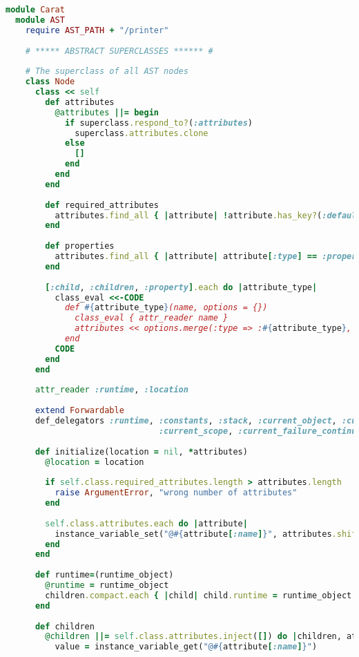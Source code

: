 \begin{lstlisting}[title={\small\ttfamily\bfseries ast/ast.rb},language=Ruby]
module Carat
  module AST
    require AST_PATH + "/printer"
    
    # ***** ABSTRACT SUPERCLASSES ****** #
    
    # The superclass of all AST nodes
    class Node
      class << self
        def attributes
          @attributes ||= begin
            if superclass.respond_to?(:attributes)
              superclass.attributes.clone
            else
              []
            end
          end
        end
        
        def required_attributes
          attributes.find_all { |attribute| !attribute.has_key?(:default) }
        end
        
        def properties
          attributes.find_all { |attribute| attribute[:type] == :property }
        end
        
        [:child, :children, :property].each do |attribute_type|
          class_eval <<-CODE
            def #{attribute_type}(name, options = {})
              class_eval { attr_reader name }
              attributes << options.merge(:type => :#{attribute_type}, :name => name)
            end
          CODE
        end
      end
      
      attr_reader :runtime, :location
      
      extend Forwardable
      def_delegators :runtime, :constants, :stack, :current_object, :current_location,
                               :current_scope, :current_failure_continuation
      
      def initialize(location = nil, *attributes)
        @location = location
        
        if self.class.required_attributes.length > attributes.length
          raise ArgumentError, "wrong number of attributes"
        end
        
        self.class.attributes.each do |attribute|
          instance_variable_set("@#{attribute[:name]}", attributes.shift || attribute[:default])
        end
      end
      
      def runtime=(runtime_object)
        @runtime = runtime_object
        children.compact.each { |child| child.runtime = runtime_object if child.is_a?(Node) }
      end
      
      def children
        @children ||= self.class.attributes.inject([]) do |children, attribute|
          value = instance_variable_get("@#{attribute[:name]}")
          

\end{lstlisting}
